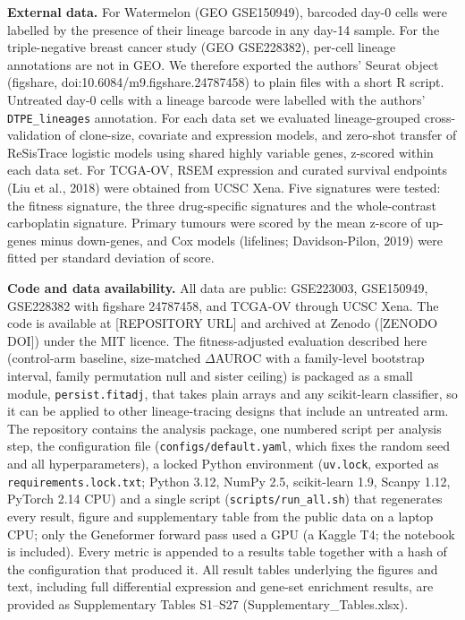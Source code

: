 \documentclass[11pt,a4paper]{article}
\begin{document}
\textbf{External data.} For Watermelon (GEO GSE150949), barcoded day-0 cells were labelled by the presence of their lineage barcode in any day-14 sample. For the triple-negative breast cancer study (GEO GSE228382), per-cell lineage annotations are not in GEO. We therefore exported the authors' Seurat object (figshare, doi:10.6084/m9.figshare.24787458) to plain files with a short R script. Untreated day-0 cells with a lineage barcode were labelled with the authors' \texttt{DTPE\_lineages} annotation. For each data set we evaluated lineage-grouped cross-validation of clone-size, covariate and expression models, and zero-shot transfer of ReSisTrace logistic models using shared highly variable genes, z-scored within each data set. For TCGA-OV, RSEM expression and curated survival endpoints (Liu et al., 2018) were obtained from UCSC Xena. Five signatures were tested: the fitness signature, the three drug-specific signatures and the whole-contrast carboplatin signature. Primary tumours were scored by the mean z-score of up-genes minus down-genes, and Cox models (lifelines; Davidson-Pilon, 2019) were fitted per standard deviation of score.

\textbf{Code and data availability.} All data are public: GSE223003, GSE150949, GSE228382 with figshare 24787458, and TCGA-OV through UCSC Xena. The code is available at [REPOSITORY URL] and archived at Zenodo ([ZENODO DOI]) under the MIT licence. The fitness-adjusted evaluation described here (control-arm baseline, size-matched $\Delta$AUROC with a family-level bootstrap interval, family permutation null and sister ceiling) is packaged as a small module, \texttt{persist.fitadj}, that takes plain arrays and any scikit-learn classifier, so it can be applied to other lineage-tracing designs that include an untreated arm. The repository contains the analysis package, one numbered script per analysis step, the configuration file (\texttt{configs/default.yaml}, which fixes the random seed and all hyperparameters), a locked Python environment (\texttt{uv.lock}, exported as \texttt{requirements.lock.txt}; Python 3.12, NumPy 2.5, scikit-learn 1.9, Scanpy 1.12, PyTorch 2.14 CPU) and a single script (\texttt{scripts/run\_all.sh}) that regenerates every result, figure and supplementary table from the public data on a laptop CPU; only the Geneformer forward pass used a GPU (a Kaggle T4; the notebook is included). Every metric is appended to a results table together with a hash of the configuration that produced it. All result tables underlying the figures and text, including full differential expression and gene-set enrichment results, are provided as Supplementary Tables S1--S27 (Supplementary\_Tables.xlsx).
\end{document}
